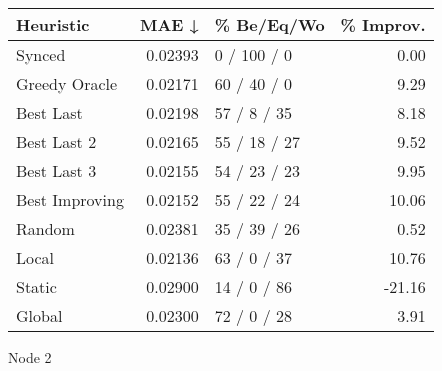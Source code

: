 \begin{tabular}{lrlr}
\toprule
\textbf{Heuristic} & \textbf{MAE ↓} & \textbf{\% Be/Eq/Wo} & \textbf{\% Improv.} \\
\midrule
            Synced &        0.02393 &          0 / 100 / 0 &                0.00 \\
     Greedy Oracle &        0.02171 &          60 / 40 / 0 &                9.29 \\
         Best Last &        0.02198 &          57 / 8 / 35 &                8.18 \\
       Best Last 2 &        0.02165 &         55 / 18 / 27 &                9.52 \\
       Best Last 3 &        0.02155 &         54 / 23 / 23 &                9.95 \\
    Best Improving &        0.02152 &         55 / 22 / 24 &               10.06 \\
            Random &        0.02381 &         35 / 39 / 26 &                0.52 \\
             Local &        0.02136 &          63 / 0 / 37 &               10.76 \\
            Static &        0.02900 &          14 / 0 / 86 &              -21.16 \\
            Global &        0.02300 &          72 / 0 / 28 &                3.91 \\
\bottomrule
\end{tabular}
\caption{Node 2}
\label{tab:non_lr01_le2_bs4_2}
